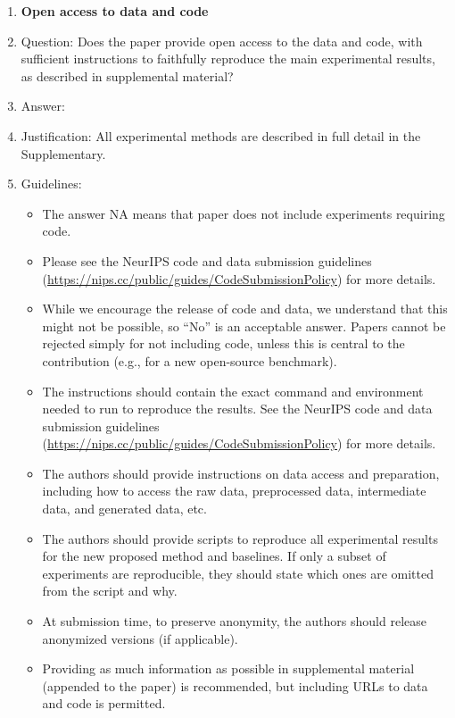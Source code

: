 \documentclass{article}
\theoremstyle{definition} \newtheorem{definition}{Definition}  \newtheorem{example}{Example}
\theoremstyle{remark} \newtheorem{remark}{Remark}
\newcounter{ct}
\begin{document}
\begin{enumerate}
\item {\bf Open access to data and code}
    \item[] Question: Does the paper provide open access to the data and code, with sufficient instructions to faithfully reproduce the main experimental results, as described in supplemental material?
    \item[] Answer: \answerYes{} %
    \item[] Justification: All experimental methods are described in full detail in the Supplementary. 
    \item[] Guidelines:
    \begin{itemize}
        \item The answer NA means that paper does not include experiments requiring code.
        \item Please see the NeurIPS code and data submission guidelines (\url{https://nips.cc/public/guides/CodeSubmissionPolicy}) for more details.
        \item While we encourage the release of code and data, we understand that this might not be possible, so “No” is an acceptable answer. Papers cannot be rejected simply for not including code, unless this is central to the contribution (e.g., for a new open-source benchmark).
        \item The instructions should contain the exact command and environment needed to run to reproduce the results. See the NeurIPS code and data submission guidelines (\url{https://nips.cc/public/guides/CodeSubmissionPolicy}) for more details.
        \item The authors should provide instructions on data access and preparation, including how to access the raw data, preprocessed data, intermediate data, and generated data, etc.
        \item The authors should provide scripts to reproduce all experimental results for the new proposed method and baselines. If only a subset of experiments are reproducible, they should state which ones are omitted from the script and why.
        \item At submission time, to preserve anonymity, the authors should release anonymized versions (if applicable).
        \item Providing as much information as possible in supplemental material (appended to the paper) is recommended, but including URLs to data and code is permitted.
    \end{itemize}



\end{enumerate}
\end{document}
